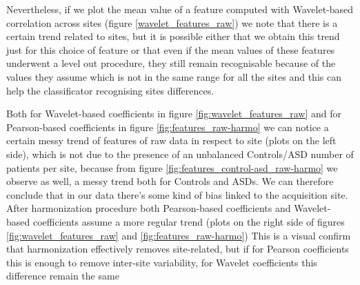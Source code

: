 \documentclass[10pt]{report}
\begin{document}
Nevertheless, if we plot the mean value of a feature computed with Wavelet-based correlation across sites (figure \ref{wavelet_features_raw}) we note that there is a certain trend related to sites, but it is possible either that we obtain this trend just for this choice of feature or that even if the mean values of these features underwent a level out procedure, they still remain recognisable because of the values they assume which is not in the same range for all the sites and this can help the classificator recognising sites differences.

\hfill

Both for Wavelet-based coefficients in figure \ref{fig:wavelet_features_raw} and for Pearson-based coefficients in figure \ref{fig:features_raw-harmo} we can notice a certain messy trend of features of raw data in respect to site (plots on the left side), which is not due to the presence of an unbalanced Controls/ASD number of patients per site, because from figure \ref{fig:features_control-asd_raw-harmo} we observe as well, a messy trend both for Controls and ASDs.
We can therefore conclude that in our data there's some kind of bias linked to the acquisition site.
After harmonization procedure both Pearson-based coefficients and Wavelet-based coefficients assume a more regular trend (plots on the right side of figures  \ref{fig:wavelet_features_raw} and \ref{fig:features_raw-harmo})
This is a visual confirm that harmonization effectively removes site-related, but if for Pearson coefficients this is enough to remove inter-site variability, for Wavelet coefficients this difference remain the same

\end{document}
